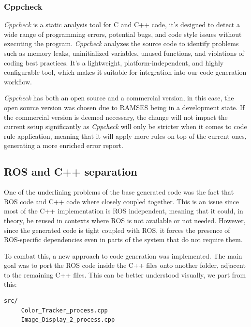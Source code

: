 \subsubsection{Cppcheck}
\label{sec:impl_side_cppchecker}

\textit{Cppcheck} is a static analysis tool for C and C++ code, it's designed to detect a wide range of programming errors, potential bugs, and code style issues without executing the program. \textit{Cppcheck} analyzes the source code to identify problems such as memory leaks, uninitialized variables, unused functions, and violations of coding best practices. It's a lightweight, platform-independent, and highly configurable tool, which makes it suitable for integration into our code generation workflow.

\textit{Cppcheck} has both an open source and a commercial version, in this case, the open source version was chosen due to \gls{RAMSES} being in a development state. If the commercial version is deemed necessary, the change will not impact the current setup significantly as \textit{Cppcheck} will only be stricter when it comes to code rule application, meaning that it will apply more rules on top of the current ones, generating a more enriched error report.

\subsection{ROS and C++ separation}
\label{sec:impl_ros_separation}

One of the underlining problems of the base generated code was the fact that \gls{ROS} code and C++ code where closely coupled together. This is an issue since most of the C++ implementation is \gls{ROS} independent, meaning that it could, in theory, be reused in contexts where \gls{ROS} is not available or not needed. However, since the generated code is tight coupled with \gls{ROS}, it forces the presence of ROS-specific dependencies even in parts of the system that do not require them. 

To combat this, a new approach to code generation was implemented. The main goal was to port the \gls{ROS} code inside the C++ files onto another folder, adjacent to the remaining C++ files. This can be better understood visually, we part from this:

\begin{verbatim}
src/
	 Color_Tracker_process.cpp
	 Image_Display_2_process.cpp
\end{verbatim}



